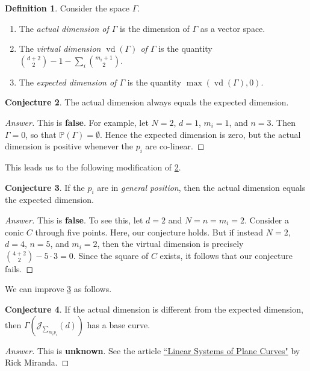 \documentclass[10pt,letterpaper,cm]{nupset}
\theoremstyle{definition}
\newtheorem{defn}{Definition}[subsection]
\theoremstyle{theorem}
\newtheorem{conj}[defn]{Conjecture}
\theoremstyle{remark}
\newcommand{\J}{\mathcal J}
\renewcommand{\P}{\mathbb P}
\newcommand{\1}{\mathbb{1}}
\newcommand{\0}{\vec 0}
\DeclareMathOperator{\vd}{vd}
\newcommand{\be}{\begin{enumerate}}
\newcommand{\ee}{\end{enumerate}}
\begin{document}
\begin{defn} Consider the space $\Gamma$.
\be
\item The \textit{actual dimension of $\Gamma$} is the dimension of $\Gamma$ as a vector space.
\item The \textit{virtual dimension $\vd\left(\Gamma\right)$ of $\Gamma$} is the quantity ${{d+2}\choose 2}-1 - \sum_i{{m_i+1}\choose 2}$.
\item The \textit{expected dimension of $\Gamma$} is the quantity $\max\left(\vd\left(\Gamma\right), 0\right)$.
\ee
\end{defn}

\begin{conj}\label{c1}
The actual dimension always equals the expected dimension.
\end{conj}
\begin{proof}[Answer]
This is \textbf{false}. For example, let $N=2$, $d = 1$, $m_i =1$, and $n=3$. Then $\Gamma =0$, so that $\P\left(\Gamma\right) =\emptyset$. Hence the expected dimension is zero, but the actual dimension is positive whenever the $p_i$ are co-linear.
\end{proof}

This leads us to the following modification of \cref{c1}.

\begin{conj}\label{c2}
If the $p_i$ are in \textit{general position}, then the actual dimension equals the expected dimension.
\end{conj}
\begin{proof}[Answer]
This is \textbf{false}. To see this, let $d=2$ and $N= n = m_i=2$. Consider a conic $C$ through five points. Here, our conjecture holds. But if instead $N=2$, $d=4$, $n=5$, and $m_i=2$, then the virtual dimension is precisely ${{4+2}\choose 2}-5\cdot 3 =0$. Since the square of $C$ exists, it follows that our conjecture fails.
\end{proof}

We can improve \cref{c2} as follows.

\begin{conj}
If the actual dimension is different from the expected dimension, then $\Gamma\left(\J_{\sum_{m_ip_i}}(d)\right)$ has a base curve.
\end{conj}
\begin{proof}[Answer]
This is \textbf{unknown}. See the article \href{https://pdfs.semanticscholar.org/3db0/6dd64b62f15f04c9caa13dba2db7ca4d9fdd.pdf}{``Linear Systems of Plane Curves"} by Rick Miranda.
\end{proof}
\end{document}
